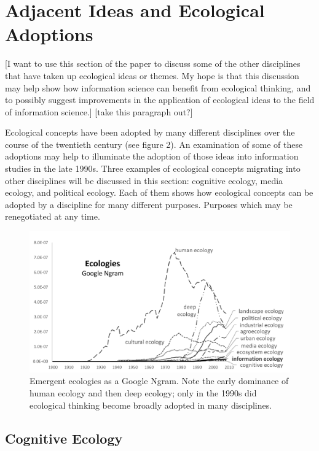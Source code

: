 \section{Adjacent Ideas and Ecological Adoptions}

[I want to use this section of the paper to discuss some of the other disciplines that have taken up ecological ideas or themes. My hope is that this discussion may help show how information science can benefit from ecological thinking, and to possibly suggest improvements in the application of ecological ideas to the field of information science.] [take this paragraph out?]

Ecological concepts have been adopted by many different disciplines over the course of the twentieth century (see figure 2). An examination of some of these adoptions may help to illuminate the adoption of those ideas into information studies in the late 1990s. Three examples of ecological concepts migrating into other disciplines will be discussed in this section: cognitive ecology, media ecology, and political ecology. Each of them shows how ecological concepts can be adopted by a discipline for many different purposes. Purposes which may be renegotiated at any time.

\begin{figure}[!ht]
  \centering
    \includegraphics[width=1.0\textwidth]{figures/ecologiesAll}
  \caption{Emergent ecologies as a Google Ngram. Note the early dominance of human ecology and then deep ecology; only in the 1990s did ecological thinking become broadly adopted in many disciplines.}
\end{figure}

\subsection{Cognitive Ecology}

